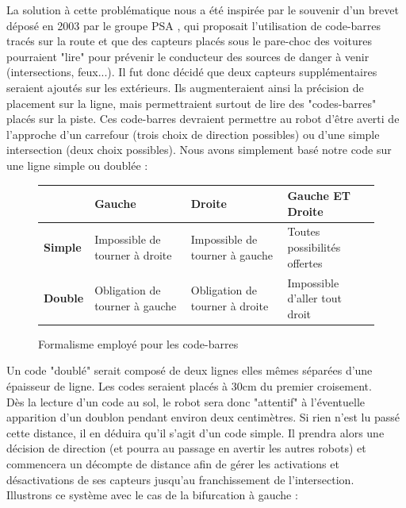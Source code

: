 		La solution à cette problématique nous a été inspirée par le souvenir d'un brevet déposé en 2003 par le groupe PSA \cite{bib5}, qui proposait l'utilisation de code-barres tracés sur la route et que des capteurs placés sous le pare-choc des voitures pourraient "lire" pour prévenir le conducteur des sources de danger à venir (intersections, feux...).
		Il fut donc décidé que deux capteurs supplémentaires seraient ajoutés sur les extérieurs. Ils augmenteraient ainsi la précision de placement sur la ligne, mais permettraient surtout de lire des "codes-barres" placés sur la piste. Ces code-barres devraient permettre au robot d'être averti de l'approche d'un carrefour (trois choix de direction possibles) ou d'une simple intersection (deux choix possibles). Nous avons simplement basé notre code sur une ligne simple ou doublée :\\
		\begin{figure}[H]
			\begin{tabu}to 
			  \hline
			   & \textbf{Gauche} & \textbf{Droite} & \textbf{Gauche ET Droite} \\
			  \hline
			  \textbf{Simple} & Impossible de tourner à droite & Impossible de tourner à gauche & Toutes possibilités offertes\\
			  \hline
			  \textbf{Double} & Obligation de tourner à gauche & Obligation de tourner à droite & Impossible d'aller tout droit \\
			  \hline
			\end{tabu}
			\caption{Formalisme employé pour les code-barres}
		\end{figure}

		Un code "doublé" serait composé de deux lignes elles mêmes séparées d'une épaisseur de ligne.
		Les codes seraient placés à 30cm du premier croisement.\\

		Dès la lecture d'un code au sol, le robot sera donc "attentif" à l'éventuelle apparition d'un doublon pendant environ deux centimètres. Si rien n'est lu passé cette distance, il en déduira qu'il s'agit d'un code simple. Il prendra alors une décision de direction (et pourra au passage en avertir les autres robots) et commencera un décompte de distance afin de gérer les activations et désactivations de ses capteurs jusqu'au franchissement de l'intersection.\\


		Illustrons ce système avec le cas de la bifurcation à gauche :

